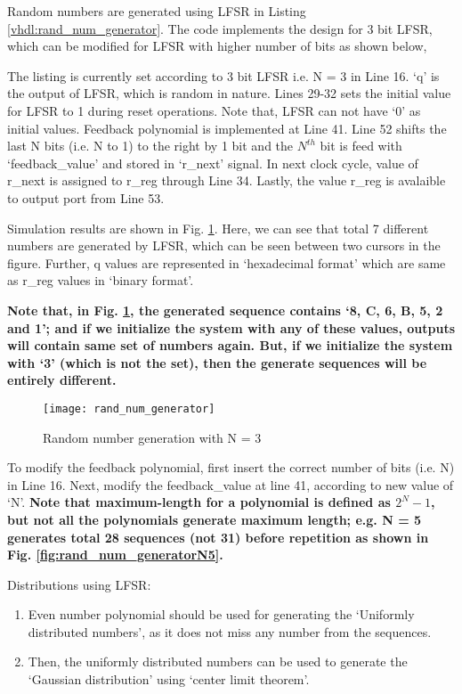 Random numbers are generated using LFSR in Listing \ref{vhdl:rand_num_generator}. The code implements the design for 3 bit LFSR, which can be modified for LFSR with higher number of bits as shown below,  
\begin{explanation}
	The listing is currently set according to 3 bit LFSR i.e. N = 3 in Line 16.  `q' is the output of LFSR, which is random in nature. Lines 29-32 sets the initial value for LFSR to 1 during reset operations. Note that, LFSR can not have `0' as initial values. Feedback polynomial is implemented at Line 41. Line 52 shifts the last N bits (i.e. N to 1) to the right by 1 bit and the $N^{th}$ bit is feed with `feedback\_value' and stored in `r\_next' signal. In next clock cycle, value of r\_next is assigned to r\_reg through Line 34. Lastly, the value r\_reg is avalaible to output port from Line 53.
	
	Simulation results are shown in Fig. \ref{fig:rand_num_generator}. Here, we can see that total 7 different numbers are generated by LFSR, which can be seen between two cursors in the figure.  Further, q values are represented in `hexadecimal format' which are same as r\_reg values in `binary format'. 
	
	\textbf{Note that, in Fig. \ref{fig:rand_num_generator}, the generated sequence contains `8, C, 6, B, 5, 2 and 1'; and if we initialize the system with any of these values, outputs will contain same set of numbers again. But, if we initialize the system with `3' (which is not the set), then the generate sequences will be entirely different.}
	
	\begin{figure}[!h]
		\centering
		\texttt{[image: rand\_num\_generator]}
		\caption{Random number generation with N = 3}
		\label{fig:rand_num_generator}
	\end{figure}
	
	To modify the feedback polynomial, first insert the correct number of bits (i.e. N) in  Line 16. Next, modify the feedback\_value at line 41, according to new value of `N'.\textbf{ Note that maximum-length for a polynomial is defined as $2^N-1$, but not all the polynomials generate maximum length; e.g. N = 5 generates total 28 sequences (not 31) before repetition as shown in Fig. \ref{fig:rand_num_generatorN5}. }
	\begin{noNumBox}
		Distributions using LFSR: 
		\begin{enumerate}
			\item Even number polynomial should be used for generating the `Uniformly distributed numbers', as it does not miss any number from the sequences. 
			\item Then, the uniformly distributed numbers can be used to generate the `Gaussian distribution' using `center limit theorem'. 
		\end{enumerate}
	\end{noNumBox}
	

\end{explanation}
